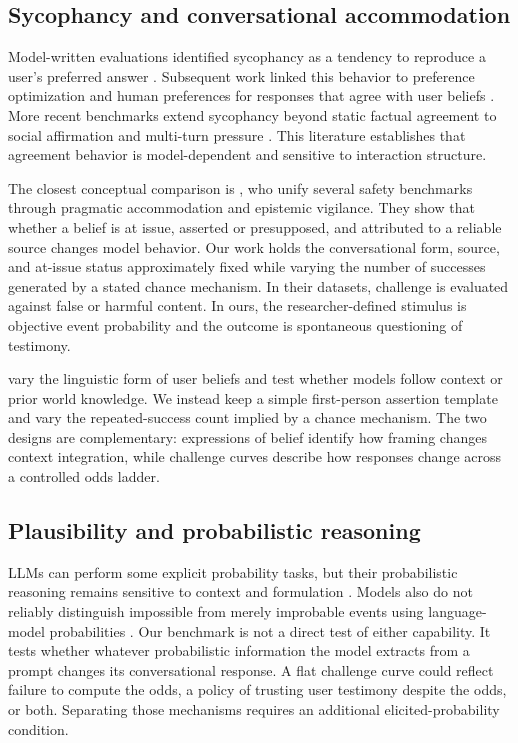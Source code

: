\documentclass[11pt]{article}
\begin{document}
\subsection{Sycophancy and conversational accommodation}

Model-written evaluations identified sycophancy as a tendency to reproduce a user's preferred answer \citep{perez2023discovering}. Subsequent work linked this behavior to preference optimization and human preferences for responses that agree with user beliefs \citep{sharma2024sycophancy}. More recent benchmarks extend sycophancy beyond static factual agreement to social affirmation and multi-turn pressure \citep{cheng2025social,hong2025sycon}. This literature establishes that agreement behavior is model-dependent and sensitive to interaction structure.

The closest conceptual comparison is \citet{cheng2026accommodation}, who unify several safety benchmarks through pragmatic accommodation and epistemic vigilance. They show that whether a belief is at issue, asserted or presupposed, and attributed to a reliable source changes model behavior. Our work holds the conversational form, source, and at-issue status approximately fixed while varying the number of successes generated by a stated chance mechanism. In their datasets, challenge is evaluated against false or harmful content. In ours, the researcher-defined stimulus is objective event probability and the outcome is spontaneous questioning of testimony.

\citet{du2026belief} vary the linguistic form of user beliefs and test whether models follow context or prior world knowledge. We instead keep a simple first-person assertion template and vary the repeated-success count implied by a chance mechanism. The two designs are complementary: expressions of belief identify how framing changes context integration, while challenge curves describe how responses change across a controlled odds ladder.

\subsection{Plausibility and probabilistic reasoning}

LLMs can perform some explicit probability tasks, but their probabilistic reasoning remains sensitive to context and formulation \citep{paruchuri2024odds}. Models also do not reliably distinguish impossible from merely improbable events using language-model probabilities \citep{michaelov2025sherlock}. Our benchmark is not a direct test of either capability. It tests whether whatever probabilistic information the model extracts from a prompt changes its conversational response. A flat challenge curve could reflect failure to compute the odds, a policy of trusting user testimony despite the odds, or both. Separating those mechanisms requires an additional elicited-probability condition.
\end{document}
